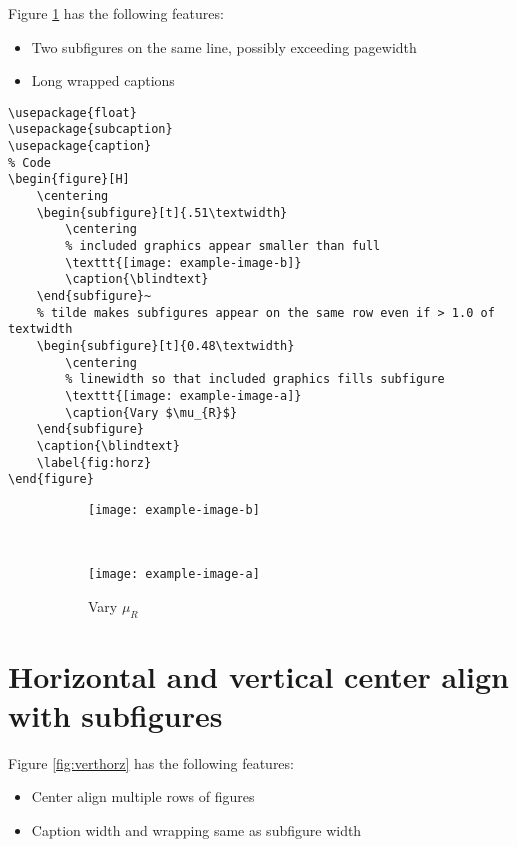 \documentclass[12pt,english]{article}
\begin{document}
Figure \ref{fig:horz} has the following features:
\begin{itemize}
    \item Two subfigures on the same line, possibly exceeding pagewidth
    \item Long wrapped captions
\end{itemize}

\begin{lstlisting}[frame=single]
% Included Package
\usepackage{float}
\usepackage{subcaption}
\usepackage{caption}
% Code
\begin{figure}[H]
    \centering
    \begin{subfigure}[t]{.51\textwidth}
        \centering
        % included graphics appear smaller than full
        \texttt{[image: example-image-b]}
        \caption{\blindtext}
    \end{subfigure}~
    % tilde makes subfigures appear on the same row even if > 1.0 of textwidth
	\begin{subfigure}[t]{0.48\textwidth}
	    \centering
	    % linewidth so that included graphics fills subfigure
    	\texttt{[image: example-image-a]}
    	\caption{Vary $\mu_{R}$}
	\end{subfigure}
	\caption{\blindtext}
	\label{fig:horz}
\end{figure}
\end{lstlisting}

\par\medskip
\begin{figure}[H]
    \centering
    \begin{subfigure}[t]{.51\textwidth}
        \centering
        \texttt{[image: example-image-b]}
        \caption{\blindtext}
    \end{subfigure}~
	\begin{subfigure}[t]{0.48\textwidth}
	    \centering
    	\texttt{[image: example-image-a]}
    	\caption{Vary $\mu_{R}$}
	\end{subfigure}
	\caption{\blindtext}
	\label{fig:horz}
\end{figure}
\pagebreak

\section{Horizontal and vertical center align with subfigures}
Figure \ref{fig:verthorz} has the following features:
\begin{itemize}
    \item Center align multiple rows of figures
    \item Caption width and wrapping same as subfigure width
\end{itemize}
\end{document}
